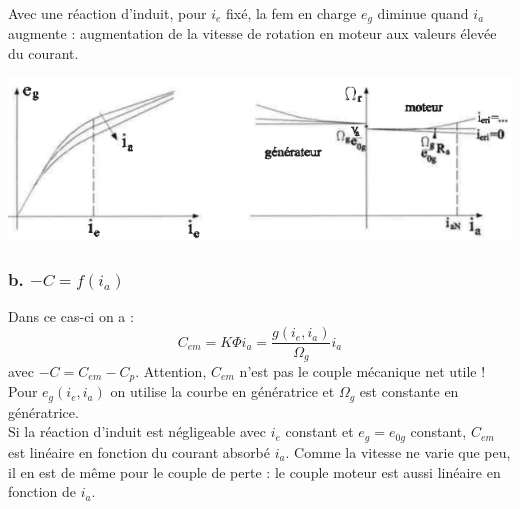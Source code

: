 		Avec une réaction d'induit, pour $i_e$ fixé, la fem en charge $e_g$ diminue quand 
		$i_a$ augmente : augmentation de la vitesse de rotation en moteur aux valeurs 
		élevée du courant.
		\begin{center}
			\includegraphics[scale=0.5]{ch4/image24.png}
		\end{center}
	
		\subsubsection{b. $-C = f(i_a)$}
		Dans ce cas-ci on a : 
		\begin{equation}
		C_{em} = K\Phi i_a = \dfrac{g(i_e,i_a)}{\Omega_g}i_a
		\end{equation}
		avec $-C = C_{em}-C_p$. Attention, $C_{em}$ n'est pas le couple mécanique net utile ! 
		Pour $e_g(i_e,i_a)$ on utilise la courbe en génératrice et $\Omega_g$ est constante 
		en génératrice. \\
		Si la réaction d'induit est négligeable avec $i_e$ constant et $e_g=e_{0g}$ constant, 
		$C_{em}$ est linéaire en fonction du courant absorbé $i_a$. Comme la vitesse ne varie 
		que peu, il en est de même pour le couple de perte : le couple moteur est aussi linéaire 
		en fonction de $i_a$.
	

	
	
	
	
	
	
	
	
	
	
	
	
	
	
	
	
	
	
	
	
	
	
	
	
	
	
	
	
	
	
	
	
	
		
		
